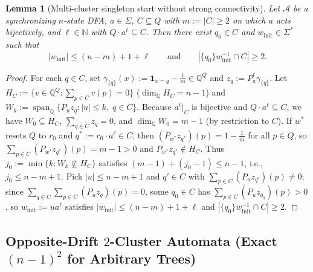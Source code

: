 \documentclass[11pt,a4paper]{article}
\newtheorem{lemma}[theorem]{Lemma}
\theoremstyle{definition}
\theoremstyle{remark}
\newcommand{\one}{\mathbf{1}}
\newcommand{\Q}{\mathbb{Q}}
\newcommand{\N}{\mathbb{N}}
\newcommand{\cA}{\mathcal{A}}
\begin{document}
\begin{lemma}[Multi-cluster singleton start without strong connectivity]
\label{lem:mc-start}
Let $\cA$ be a synchronizing $n$-state DFA, $a \in \Sigma$, $C \subseteq Q$ with $m := |C| \ge 2$ on which $a$ acts bijectively, and $\ell \in \N$ with $Q \cdot a^\ell \subseteq C$. Then there exist $q_0 \in C$ and $w_{\mathrm{init}} \in \Sigma^*$ such that
\[
  |w_{\mathrm{init}}| \le (n - m) + 1 + \ell \qquad\text{and}\qquad |\{q_0\} w_{\mathrm{init}}^{-1} \cap C| \ge 2.
\]
\end{lemma}
\begin{proof}
For each $q \in C$, set $\gamma_{\{q\}}(x) := \one_{x=q} - \frac{1}{m} \in \Q^Q$ and $z_q := P_a^\ell \gamma_{\{q\}}$. Let $H_C := \{v \in \Q^Q : \sum_{p \in C} v(p) = 0\}$ ($\dim_\Q H_C = n - 1$) and $W_k := \operatorname{span}_\Q\{P_u z_q : |u| \le k,\; q \in C\}$. Because $a^\ell|_C$ is bijective and $Q \cdot a^\ell \subseteq C$, we have $W_0 \subseteq H_C$, $\sum_{q \in C} z_q = 0$, and $\dim_\Q W_0 = m - 1$ (by restriction to $C$). If $w^*$ resets $Q$ to $r_0$ and $q^* := r_0 \cdot a^\ell \in C$, then $(P_{w^*} z_{q^*})(p) = 1 - \frac{1}{m}$ for all $p \in Q$, so $\sum_{p \in C} (P_{w^*} z_{q^*})(p) = m - 1 > 0$ and $P_{w^*} z_{q^*} \notin H_C$. Thus $j_0 := \min\{k : W_k \not\subseteq H_C\}$ satisfies $(m - 1) + (j_0 - 1) \le n - 1$, i.e., $j_0 \le n - m + 1$. Pick $|u| \le n - m + 1$ and $q' \in C$ with $\sum_{p \in C}(P_u z_{q'})(p) \neq 0$; since $\sum_{q \in C} \sum_{p \in C} (P_u z_q)(p) = 0$, some $q_0 \in C$ has $\sum_{p \in C} (P_u z_{q_0})(p) > 0$, so $w_{\mathrm{init}} := u a^\ell$ satisfies $|w_{\mathrm{init}}| \le (n - m) + 1 + \ell$ and $|\{q_0\} w_{\mathrm{init}}^{-1} \cap C| \ge 2$.
\end{proof}

\subsection{Opposite-Drift \texorpdfstring{$2$}{2}-Cluster Automata (Exact \texorpdfstring{$(n-1)^2$}{(n-1)\textasciicircum 2} for Arbitrary Trees)}
\end{document}
